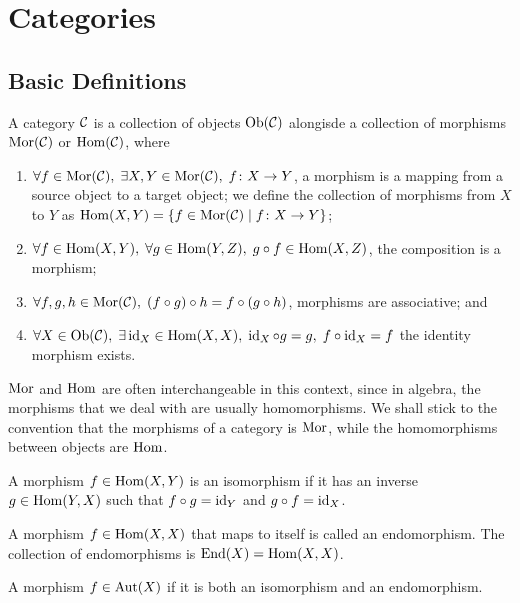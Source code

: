 \section{Categories}\label{sec:categories}

\subsection{Basic Definitions}

\begin{definition}
    A category \(\mathcal{C}\) is a collection of objects \(\operatorname{Ob}(\mathcal{C})\)
    alongisde a collection of morphisms \(\operatorname{Mor}(\mathcal{C})\) or \(\operatorname{Hom}(\mathcal{C})\),
    where
    \begin{enumerate}[label={(\roman*)}, itemsep=0mm]
        \item \(\forall f \in \operatorname{Mor}(\mathcal{C}),\; \exists X,Y \in \operatorname{Mor}(\mathcal{C}),\; f\colon X\to Y\),
            a morphism is a mapping from a source object to a target object;
            we define the collection of morphisms from \(X\) to \(Y\)
            as \(\operatorname{Hom}(X,Y) = \{f\in\operatorname{Mor}(\mathcal{C}) \mid f\colon X\to Y\}\);
        \item \(\forall f \in \operatorname{Hom}(X,Y),\; \forall g \in \operatorname{Hom}(Y,Z),\; g \circ f \in \operatorname{Hom}(X,Z)\),
            the composition is a morphism;
        \item \(\forall f,g,h \in \operatorname{Mor}(\mathcal{C}),\; (f \circ g) \circ h = f \circ (g \circ h)\),
            morphisms are associative; and
        \item \(\forall X \in \operatorname{Ob}(\mathcal{C}),\; \exists \operatorname{id}_X \in \operatorname{Hom}(X,X),\; \operatorname{id}_X \circ g = g,\; f \circ \operatorname{id}_X = f\)
            the identity morphism exists.
    \end{enumerate}
\end{definition}
\begin{remark}
    \(\operatorname{Mor}\) and \(\operatorname{Hom}\) are often interchangeable in this context,
    since in algebra, the morphisms that we deal with are usually homomorphisms.
    We shall stick to the convention that the morphisms of a category is \(\operatorname{Mor}\),
    while the homomorphisms between objects are \(\operatorname{Hom}\).
\end{remark}

\begin{definition}
    A morphism \(f \in \operatorname{Hom}(X,Y)\) is an isomorphism
    if it has an inverse \(g \in \operatorname{Hom}(Y,X)\)
    such that \(f \circ g = \operatorname{id}_Y\) and \(g \circ f = \operatorname{id}_X\).
\end{definition}
\begin{definition}
    A morphism \(f \in \operatorname{Hom}(X,X)\) that maps to itself is called an endomorphism.
    The collection of endomorphisms is \(\operatorname{End}(X) = \operatorname{Hom}(X,X)\).
\end{definition}
\begin{definition}
    A morphism \(f \in \operatorname{Aut}(X)\) if it is both an isomorphism and an endomorphism.
\end{definition}

